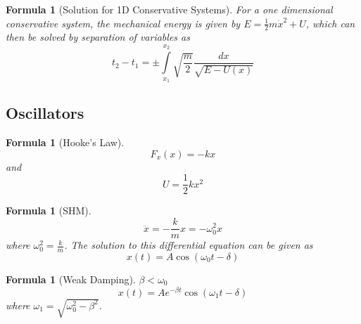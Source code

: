\documentclass[12pt]{article}
\newtheorem{for}[thm]{Formula}
\theoremstyle{definition}
\theoremstyle{remark}
\numberwithin{equation}{section}
\begin{document}
\begin{for}[Solution for 1D Conservative Systems]
        For a one dimensional conservative system, the mechanical energy is given by $E = \frac{1}{2}m\dot{x}^2+U$, which can then be solved by separation of variables as \begin{equation}
                t_2 - t_1 = \pm \int\limits_{x_1}^{x_2}\sqrt{\frac{m}{2}}\frac{dx}{\sqrt{E-U(x)}}
        \end{equation}
\end{for}

\vspace{15pt}



\subsection{Oscillators}


\begin{for}[Hooke's Law]
        \begin{equation}
                F_x(x) = -kx
        \end{equation}
        and
        \begin{equation}
                U = \frac{1}{2}kx^2
        \end{equation}
\end{for}

\vspace{15pt}


\begin{for}[SHM]
       \begin{equation}
                \ddot{x} = -\frac{k}{m}x = -\omega_0^2x
        \end{equation}
        where $\omega_0^2 = \frac{k}{m}$. The solution to this differential equation can be given as \begin{equation}
                x(t) = A\cos(\omega_0 t - \delta)
        \end{equation}
\end{for}


\vspace{15pt}

\begin{for}[Weak Damping]
        $\beta < \omega_0$\begin{equation}
                x(t) = Ae^{-\beta t}\cos(\omega_1 t - \delta)
        \end{equation}
        where $\omega_1 = \sqrt{\omega_0^2 - \beta^2}$.
\end{for}
\end{document}
